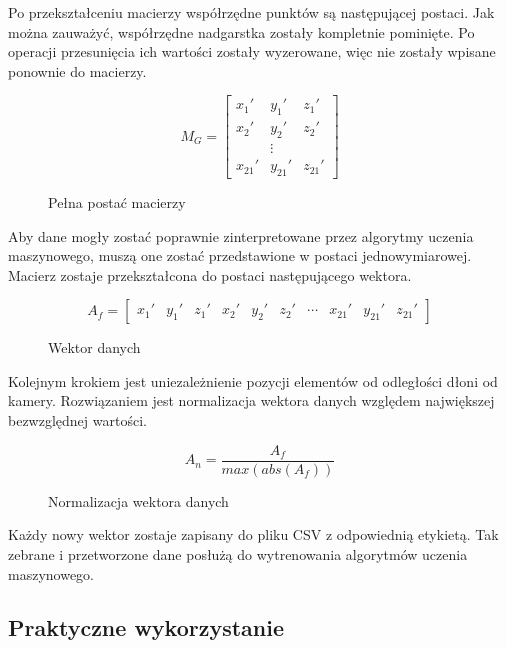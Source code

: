\quad Po przekształceniu macierzy współrzędne punktów są następującej postaci. Jak można zauważyć, współrzędne nadgarstka zostały kompletnie pominięte. Po operacji przesunięcia ich wartości zostały wyzerowane, więc nie zostały wpisane ponownie do macierzy. 

\begin{figure}[H]
    \begin{equation}
        M_G = 
        \begin{bmatrix}
        x_1' & y_1' & z_1' \\
        x_2' & y_2' & z_2' \\
            & \vdots &     \\
        x_{21}' & y_{21}' & z_{21}'
        \end{bmatrix}
    \end{equation}    
    \caption{Pełna postać macierzy}
\end{figure}

\quad Aby dane mogły zostać poprawnie zinterpretowane przez algorytmy uczenia maszynowego, muszą one zostać przedstawione w postaci jednowymiarowej. Macierz zostaje przekształcona do postaci następującego wektora. 

\begin{figure}[H]
    \begin{equation}
        A_f=
        \begin{bmatrix}
            x_1' & y_1' & z_1' & x_2' & y_2' & z_2' & \cdots & x_{21}' & y_{21}' & z_{21}'
        \end{bmatrix}
    \end{equation}  
    \caption{Wektor danych}
\end{figure}

\quad Kolejnym krokiem jest uniezależnienie pozycji elementów od odległości dłoni od kamery. Rozwiązaniem jest normalizacja wektora danych względem największej bezwzględnej wartości. 

\begin{figure}[H]
\begin{equation}
    A_n=\dfrac{A_f}{max(abs(A_f))}
\end{equation}
\caption{Normalizacja wektora danych}
\end{figure}

\quad Każdy nowy wektor zostaje zapisany do pliku CSV z odpowiednią etykietą. Tak zebrane i przetworzone dane posłużą do wytrenowania algorytmów uczenia maszynowego.

\newpage
\subsection{Praktyczne wykorzystanie}


